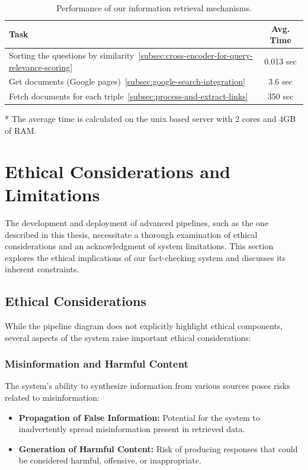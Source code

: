 \begin{table}[ht!]
    \centering
    \caption{Performance of our information retrieval mechanisms.}
    \begin{threeparttable}
    \begin{tabular}{lc}
        \toprule
        \textbf{Task} & \textbf{Avg. Time}\tnote{*} \\
        \midrule
        Sorting the questions by similarity~\ref{subsec:cross-encoder-for-query-relevance-scoring} & 0.013 sec \\
        Get documents (Google pages)~\ref{subsec:google-search-integration} & 3.6 sec \\
        Fetch documents for each triple~\ref{subsec:process-and-extract-links} & 350 sec \\
        \bottomrule
    \end{tabular}
    \begin{tablenotes}
        \item[*] The average time is calculated on the unix based server with 2 cores and 4GB of RAM\@.
    \end{tablenotes}
    \end{threeparttable}
    \label{tab:pipeline-performance-report-2}
\end{table}

\section{Ethical Considerations and Limitations}\label{sec:ethical-considerations-and-limitations}
The development and deployment of advanced pipelines, such as the one described in this thesis, necessitate a thorough examination of ethical considerations and an acknowledgment of system limitations.
This section explores the ethical implications of our fact-checking system and discusses its inherent constraints.

\subsection{Ethical Considerations}\label{subsec:ethical-considerations}
While the pipeline diagram does not explicitly highlight ethical components, several aspects of the system raise important ethical considerations:

\subsubsection{Misinformation and Harmful Content}\label{subsubsec:misinformation-and-harmful-content}
The system's ability to synthesize information from various sources poses risks related to misinformation:
\begin{itemize}
    \item \textbf{Propagation of False Information:} Potential for the system to inadvertently spread misinformation present in retrieved data.
    \item \textbf{Generation of Harmful Content:} Risk of producing responses that could be considered harmful, offensive, or inappropriate.
\end{itemize}

